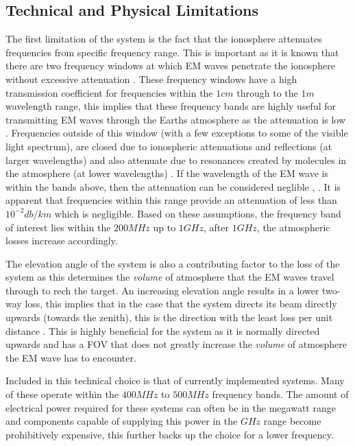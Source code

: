 \documentclass[11pt]{witseiepaper}
\begin{document}
\subsection{Technical and Physical Limitations} \label{sec:TechnicalandPhysicalLimitations}

The first limitation of the system is the fact that the ionosphere attenuates frequencies from specific frequency range. This is important as it is known that there are two frequency windows at which EM waves penetrate the ionosphere without excessive attenuation \cite{ObjectInformation}.
These frequency windows have a high transmission coefficient for frequencies within the $1 cm$ through to the $1 m$ wavelength range, this implies that these frequency bands are highly useful for transmitting EM waves through the Earths atmosphere as the attenuation is low \cite{frequencyAttenuation}. Frequencies outside of this window (with a few exceptions to some of the visible light spectrum), are closed due to ionospheric attenuations and reflections (at larger wavelengths) and also attenuate due to resonances created by molecules in the atmosphere (at lower wavelengths) \cite{frequencyAttenuation}.  
If the wavelength of the EM wave is within the bands above, then the attenuation can be considered neglible \cite{ionosphereAttenuationStandard}, \cite[p.~15,124]{radarHandbook}. It is apparent that frequencies within this range provide an attenuation of less than $10^{-2} db/km$ which is negligible.
Based on these assumptions, the frequency band of interest lies within the $200 MHz$ up to $1 GHz$, after $1 GHz$, the atmospheric losses increase accordingly.

The elevation angle of the system is also a contributing factor to the loss of the system as this determines the \textit{volume} of atmosphere that the EM waves travel through to rech the target. An increasing elevation angle results in a lower two-way loss, this implies that in the case that the system directs its beam directly upwards (towards the zenith), this is the direction with the least loss per unit distance \cite[p.~70]{elevationLoss}. This is highly beneficial for the system as it is normally directed upwards and has a FOV that does not greatly increase the \textit{volume} of atmosphere the EM wave has to encounter.

Included in this technical choice is that of currently implemented systems. Many of these operate within the $400 MHz$ to $500 MHz$ frequency bands.
The amount of electrical power required for these systems can often be in the megawatt range and components capable of supplying this power in the $GHz$ range become prohibitively expensive, this further backs up the choice for a lower frequency.
\end{document}
